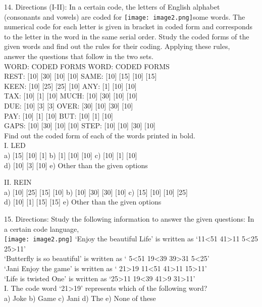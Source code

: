 \documentclass[
]{article}
\begin{document}
14. Directions (I-II): In a certain code, the letters of English alphabet (consonants and vowels)
are coded for 
\texttt{[image: image2.png]}some words. The numerical code for each letter is given in bracket in coded
form and corresponds to the letter in the word in the same serial order. Study the coded
forms of the given words and find out the rules for their coding. Applying these rules,\\
answer the questions that follow in the two sets.\\
WORD: CODED FORMS WORD: CODED FORMS\\
REST: [10] [30] [10] [10] SAME: [10] [15] [10] [15]\\
KEEN: [10] [25] [25] [10] ANY: [1] [10] [10]\\
TAX: [10] [1] [10] MUCH: [10] [30] [10] [10]\\
DUE: [10] [3] [3] OVER: [30] [10] [30] [10]\\
PAY: [10] [1] [10] BUT: [10] [1] [10]\\
GAPS: [10] [30] [10] [10] STEP: [10] [10] [30] [10]\\
Find out the coded form of each of the words printed in bold.\\

I. LED\\
a) [15] [10] [1] b) [1] [10] [10] c) [10] [1] [10]\\
d) [10] [3] [10] e) Other than the given options

II. REIN\\
a) [10] [25] [15] [10] b) [10] [30] [30] [10] c) [15] [10] [10] [25]\\
d) [10] [1] [15] [15] e) Other than the given options

15. Directions: Study the following information to answer the given questions:
In a certain code language,\\
\texttt{[image: image2.png]}
‘Enjoy the beautiful Life’ is written as ‘11<51 41>11 5<25 25>11’\\
‘Butterfly is so beautiful’ is written as ‘ 5<51 19<39 39>31 5<25’\\
‘Jani Enjoy the game’ is written as ‘ 21>19 11<51 41>11 15>11’\\
‘Life is twisted One’ is written as ‘25>11 19<39 41>9 31>11’\\

I. The code word ‘21>19’ represents which of the following word?\\
a) Joke b) Game c) Jani d) The e) None of these
\end{document}
